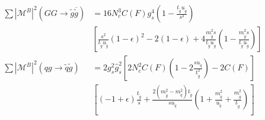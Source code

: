 \begin{align}
\sum|\mathcal{M}^B|^2(GG \to \tilde{g}\overline{\tilde{g}}) &=  16 N_c^3 C(F) g_s^4 \left( 1- \frac{t_{\tilde{g}}u_{\tilde{g}}}{s^2} \right)\nonumber\\
&\left[ \frac{s^2}{t_{\tilde{g}}u_{\tilde{g}}}(1-\epsilon)^2-2(1-\epsilon) + 4\frac{m_{\tilde{g}}^2 s}{t_{\tilde{g}}u_{\tilde{g}}}\left(1-\frac{m_{\tilde{g}}^2 s}{t_{\tilde{g}}u_{\tilde{g}}}  \right) \right]\\
\sum|\mathcal{M}^B|^2(qg \to \tilde{q}\tilde{g}) &=  2g_s^2\hat{g}_s^2 \left[ 2 N_c^2 C(F) \left(1-2\frac{s u_{\tilde{q}}}{t_{\tilde{g}}^2}\right) - 2C(F) \right] \nonumber\\
&\left[ (-1+\epsilon)\frac{t_{\tilde{g}}}{s} + \frac{2(m_{\tilde{g}}^2-m_{\tilde{q}}^2)t_{\tilde{g}}}{s u_{\tilde{q}}}\left( 1+\frac{m_{\tilde{q}}^2}{u_{\tilde{q}}} + \frac{m_{\tilde{g}}^2}{t_{\tilde{g}}} \right) \right]
\end{align}

